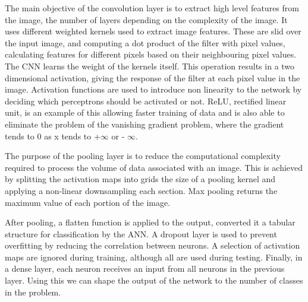 \documentclass[12pt,a4paper]{article}
\begin{document}
The main objective of the convolution layer is to extract high level features from the image, the number of layers depending on the complexity of the image. It uses different weighted kernels used to extract image features. These are slid over the input image, and computing a dot product of the filter with pixel values, calculating features for different pixels based on their neighbouring pixel values. The CNN learns the weight of the kernels itself. This operation results in a two dimensional activation, giving the response of the filter at each pixel value in the image. Activation functions are used to introduce non linearity to the network by deciding which perceptrons should be activated or not. ReLU, rectified linear unit, is an example of this allowing faster training of data and is also able to eliminate the problem of the vanishing gradient problem, where the gradient tends to 0 as x tends to +$\infty$ or - $\infty$.

The purpose of the pooling layer is to reduce the computational complexity required to process the volume of data associated with an image. This is achieved by splitting the activation maps into grids the size of a pooling kernel and applying a non-linear downsampling each section. Max pooling returns the maximum value of each portion of the image.

After pooling, a flatten function is applied to the output, converted it a tabular structure for classification by the ANN. A dropout layer is used to prevent overfitting by reducing the correlation between neurons. A selection of activation maps are ignored during training, although all are used during testing. Finally, in a dense layer, each neuron receives an input from all neurons in the previous layer. Using this we can shape the output of the network to the number of classes in the problem.
\end{document}
